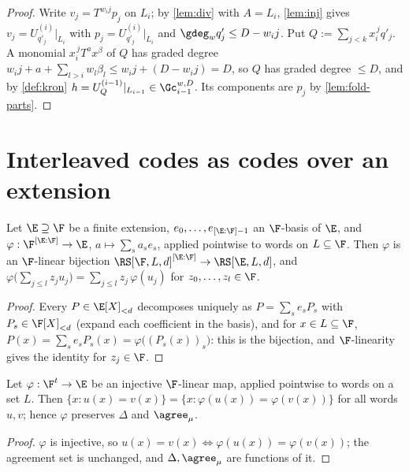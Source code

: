 \begin{proof}
Write $v_j=T^{w_ij}p_j$ on $L_i$; by \ref{lem:div} with $A=L_i$, \ref{lem:inj} gives
$v_j=U^{(i)}_{q'_j}|_{L_i}$ with $p_j=U^{(i)}_{q'_j}|_{L_i}$ and $\gdeg_w q'_j\le D-w_ij$.
Put $Q:=\sum_{j<k}x_i^{\,j}q'_j$. A monomial $x_i^{\,j}T^ax^\beta$ of $Q$ has graded degree
$w_ij+a+\sum_{l>i}w_l\beta_l\le w_ij+(D-w_ij)=D$, so $Q$ has graded degree $\le D$, and by
\ref{def:kron} $h=U^{(i-1)}_Q|_{L_{i-1}}\in\Gc_{i-1}^{w,D}$. Its components are $p_j$ by
\ref{lem:fold-parts}.
\end{proof}

\section{Interleaved codes as codes over an extension}

\begin{lemma}[Interleaved code $=$ extension-field code]\label{lem:ext}
Let $\E\supseteq\F$ be a finite extension, $e_0,\dots,e_{[\E:\F]-1}$ an $\F$-basis of
$\E$, and $\varphi:\F^{[\E:\F]}\to\E$, $a\mapsto\sum_s a_se_s$, applied pointwise to words on
$L\subseteq\F$. Then $\varphi$ is an $\F$-linear bijection $\RS[\F,L,d]^{[\E:\F]}\to\RS[\E,L,d]$, and
$\varphi\big(\sum_{j\le l} z_ju_j\big)=\sum_{j\le l} z_j\,\varphi(u_j)$ for $z_0,\dots,z_l\in\F$.
\end{lemma}

\begin{proof}
Every $P\in\E[X]_{<d}$ decomposes uniquely as $P=\sum_s e_sP_s$ with $P_s\in\F[X]_{<d}$ (expand
each coefficient in the basis), and for $x\in L\subseteq\F$,
$P(x)=\sum_s e_sP_s(x)=\varphi\big((P_s(x))_s\big)$: this is the bijection, and
$\F$-linearity gives the identity for $z_j\in\F$.
\end{proof}

\begin{lemma}\label{lem:ext-agree}
Let $\varphi:\F^t\to\E$ be an injective $\F$-linear map, applied pointwise to words on a set $L$.
Then $\{x:u(x)=v(x)\}=\{x:\varphi(u(x))=\varphi(v(x))\}$ for all words $u,v$; hence $\varphi$
preserves $\Delta$ and $\agree_\mu$.
\end{lemma}

\begin{proof}
$\varphi$ is injective, so $u(x)=v(x)\iff\varphi(u(x))=\varphi(v(x))$; the agreement set is
unchanged, and $\Delta,\agree_\mu$ are functions of it.
\end{proof}

